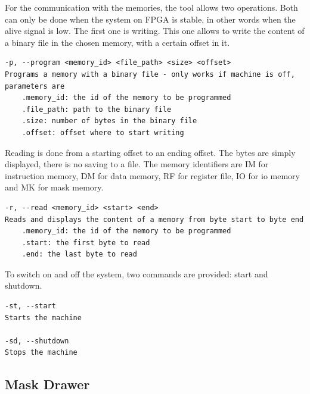 For the communication with the memories, the tool allows two operations. Both can only be done 
when the system on FPGA is stable, in other words when the alive signal is low. The first one is 
writing. This one allows to write the content of a binary file in the chosen memory, with a certain 
offset in it. 

{\small
\begin{lstlisting}[caption=Program command.]
-p, --program <memory_id> <file_path> <size> <offset>
Programs a memory with a binary file - only works if machine is off, 
parameters are
    .memory_id: the id of the memory to be programmed
    .file_path: path to the binary file
    .size: number of bytes in the binary file
    .offset: offset where to start writing
\end{lstlisting}}

Reading is done from a starting 
offset to an ending offset. The bytes are simply displayed, there is no saving to a file. 
The memory identifiers are IM for 
instruction memory, DM for data memory, RF for register file, IO for io memory and MK for mask 
memory.


{\small
\begin{lstlisting}[caption=Read command.]
-r, --read <memory_id> <start> <end>
Reads and displays the content of a memory from byte start to byte end
    .memory_id: the id of the memory to be programmed
    .start: the first byte to read
    .end: the last byte to read
\end{lstlisting}}


To switch on and off the system, two commands are provided: start and shutdown.

{\small
\begin{lstlisting}[caption=Start and shutdown commands.]
-st, --start
Starts the machine

-sd, --shutdown
Stops the machine
\end{lstlisting}}

\subsection{Mask Drawer}

